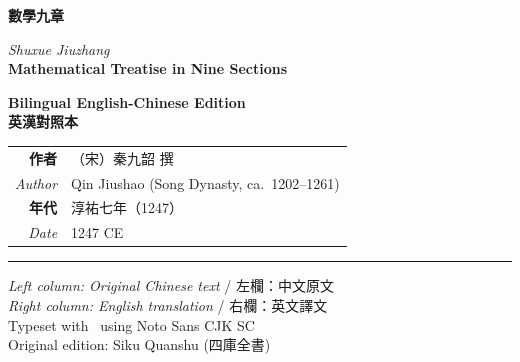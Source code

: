 \documentclass[11pt,a4paper]{article}
\newcommand{\shortline}{\noindent\rule{0.5\textwidth}{0.4pt}\par}
\begin{document}
\begin{titlepage}
\centering
\vspace*{1.5cm}

{\fontsize{26}{34}\selectfont\color{titlecolor}
\textbf{數學九章}
}

\vspace{0.8cm}

{\fontsize{15}{19}\selectfont\color{sectioncolor}
\textit{Shuxue Jiuzhang}\\[0.3em]
\textbf{Mathematical Treatise in Nine Sections}
}

\vspace{1.5cm}

{\Large\color{sectioncolor}
\textbf{Bilingual English-Chinese Edition}\\[0.5em]
\textbf{英漢對照本}
}

\vspace{1.5cm}


\vspace{2.5cm}

{\large
\begin{tabular}{rl}
\textbf{作者} & （宋）秦九韶 撰 \\
\textit{Author} & Qin Jiushao (Song Dynasty, ca.~1202--1261) \\
\textbf{年代} & 淳祐七年（1247） \\
\textit{Date} & 1247 CE \\
\end{tabular}
}

\vspace{2cm}

\shortline

\vspace{0.8cm}

{\small\color{sectioncolor}
\textit{Left column: Original Chinese text} / 左欄：中文原文\\[0.2em]
\textit{Right column: English translation} / 右欄：英文譯文\\[0.8em]
Typeset with \XeLaTeX\ using Noto Sans CJK SC\\
Original edition: Siku Quanshu (四庫全書)
}

\end{titlepage}
\end{document}
